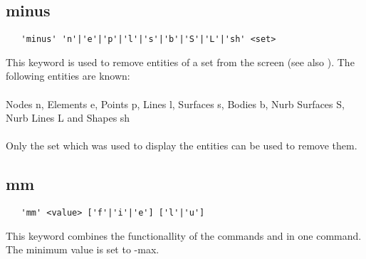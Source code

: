 \documentclass{article}
\begin{document}
\subsection{\label{minus}minus}
\begin{verbatim}
   'minus' 'n'|'e'|'p'|'l'|'s'|'b'|'S'|'L'|'sh' <set> 
\end{verbatim}
This keyword is used to remove entities of a set from the screen (see also ). The following entities are known:\\\\
Nodes n, Elements e, Points p, Lines l, Surfaces s, Bodies b, Nurb Surfaces S, Nurb Lines L and Shapes sh\\\\Only the set which was used to display the entities can be used to remove them.
 
\subsection{\label{mm}mm}
\begin{verbatim}
   'mm' <value> ['f'|'i'|'e'] ['l'|'u']
\end{verbatim}
This keyword combines the functionallity of the commands  and  in one command. The minimum value is set to -max.
\end{document}
